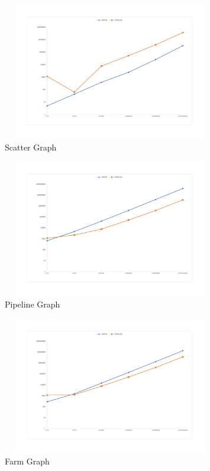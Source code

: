 \documentclass[10pt,journal,compsoc]{IEEEtran}
\begin{document}
\begin{figure}[H]
\hspace*{-0.24in}
\includegraphics[height=6cm,width=9.44cm]{jpeg/scatter-graph.pdf}
\caption{Scatter Graph}
\label{figura:scatter}
\end{figure}

\begin{figure}[H]
\hspace*{-0.24in}
\includegraphics[height=6cm,width=9.44cm]{jpeg/pipeline-graph.pdf}
\caption{Pipeline Graph}
\label{figura:pipeline}

\end{figure}

\begin{figure}[H]
\hspace*{-0.24in}
\includegraphics[height=6cm,width=9.44cm]{jpeg/farm-graph.pdf}
\caption{Farm Graph}
\label{figura:farm}
\end{figure}
\end{document}

